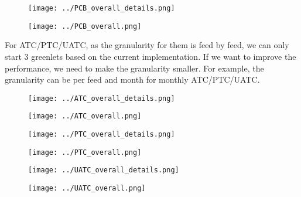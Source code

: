 \documentclass{beamer}
\begin{document}
\begin{frame}
\begin{figure}    
\begin{minipage}[t]{0.48\textwidth}
\texttt{[image: ../PCB\_overall\_details.png]}
\label{fig:immediate}
\end{minipage}
\hspace{\fill}
\begin{minipage}[t]{0.48\textwidth}
\texttt{[image: ../PCB\_overall.png]}
\label{fig:proximal}
\end{minipage}
\end{figure}
\end{frame}


\begin{frame}
For ATC/PTC/UATC, as the granularity for them is feed by feed, we can only start 3 greenlets based on the current implementation. If we want to improve the performance, we need to make the granularity smaller. For example, the granularity can be per feed and month for monthly ATC/PTC/UATC.
\begin{figure}    
\begin{minipage}[t]{0.48\textwidth}
\texttt{[image: ../ATC\_overall\_details.png]}
\label{fig:immediate}
\end{minipage}
\hspace{\fill}
\begin{minipage}[t]{0.48\textwidth}
\texttt{[image: ../ATC\_overall.png]}
\label{fig:proximal}
\end{minipage}
\end{figure}
\end{frame}

\begin{frame}
\begin{figure}    
\begin{minipage}[t]{0.48\textwidth}
\texttt{[image: ../PTC\_overall\_details.png]}
\label{fig:immediate}
\end{minipage}
\hspace{\fill}
\begin{minipage}[t]{0.48\textwidth}
\texttt{[image: ../PTC\_overall.png]}
\label{fig:proximal}
\end{minipage}
\end{figure}
\end{frame}

\begin{frame}
\begin{figure}    
\begin{minipage}[t]{0.48\textwidth}
\texttt{[image: ../UATC\_overall\_details.png]}
\label{fig:immediate}
\end{minipage}
\hspace{\fill}
\begin{minipage}[t]{0.48\textwidth}
\texttt{[image: ../UATC\_overall.png]}
\label{fig:proximal}
\end{minipage}
\end{figure}
\end{frame}
\end{document}
